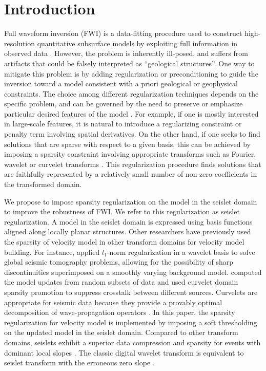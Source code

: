 \section{Introduction}
Full waveform inversion (FWI) is a data-fitting procedure used to construct high-resolution quantitative subsurface models
by exploiting full information in observed data \cite[]{lailly83,tarantola84,virieux09}.
However, the problem is inherently ill-posed, and suffers from artifacts that could be falsely interpreted as ``geological structures''.
One way to mitigate this problem is by adding regularization or preconditioning to guide the inversion 
toward a model consistent with a priori geological or geophysical constraints. 
The choice among different regularization techniques depends on the specific problem, and can be governed
by the need to preserve or emphasize particular desired features of the model \cite[]{loris07}.
For example, if one is mostly interested in large-scale features, it is natural to introduce a regularizing constraint or penalty term
involving spatial derivatives.
On the other hand, if one seeks to find solutions that are sparse with respect to a given basis, 
this can be achieved by imposing a sparsity constraint involving appropriate transforms such as Fourier, wavelet or curvelet transforms \cite[]{loris07}.
This regularization procedure finds solutions that are faithfully represented 
by a relatively small number of non-zero coefficients in the transformed domain.

We propose to impose sparsity regularization on the model in the seislet domain \cite[]{fomel10} to improve the robustness of FWI.
We refer to this regularization as seislet regularization.
A model in the seislet domain is expressed using basis functions aligned along locally planar structures.
Other researchers have previously used the sparsity of velocity model in other transform domains for velocity model building.
For instance, \cite{loris07} applied $l_1$-norm regularization in a wavelet basis to solve global seismic tomography problems,
allowing for the possibility of sharp discontinuities superimposed on a smoothly varying background model.
\cite{li12} computed the model updates from random subsets of data and used curvelet domain sparsity promotion to suppress crosstalk between different sources.
Curvelets are appropriate for seismic data because they provide a provably optimal decomposition of wave-propagation operators \cite[]{candes05}.
In this paper, the sparsity regularization for velocity model is implemented by imposing a soft thresholding on the updated model in the seislet domain.
Compared to other transform domains, seislets exhibit a superior data compression and sparsity 
for events with dominant local slopes \cite[]{chen16}.
The classic digital wavelet transform is equivalent to seislet transform with the erroneous zero slope \cite[]{fomel10}.


